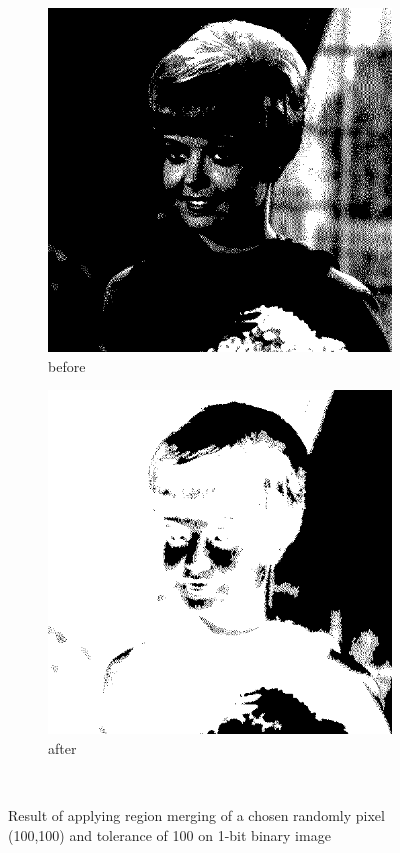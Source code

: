\documentclass[12pt]{article}
\renewcommand{\subfiguresize}{.25\textwidth}
\begin{document}
\begin{figure}[H]\centering
    \begin{subfigure}[t]{\subfiguresize}
        \includegraphics[width=\textwidth]{img/magda/girlbw.png}
        \caption{before}
    \end{subfigure}
    \hspace{2em}
    \begin{subfigure}[t]{\subfiguresize}
        \includegraphics[width=\textwidth]{img/magda/region_output_new1.png}
        \caption{after}
    \end{subfigure}\\[2em]
    \caption{Result of applying region merging of a chosen randomly pixel (100,100) and tolerance of 100 on 1-bit binary image}
\end{figure}
\end{document}
